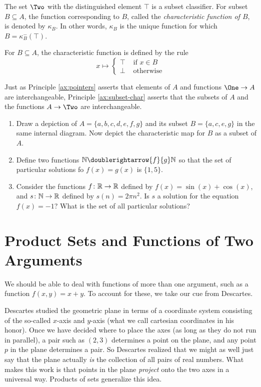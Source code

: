 \begin{principle}\label{ax:subset-char}
	The set $\Two$ with the distinguished element $\top$ is a subset classifier.
	For subset $B\subseteq A$, the function corresponding to $B$, called the \emph{characteristic function of $B$}, is denoted by $\kappa_B$.
	In other words, $\kappa_B$ is the unique function for which $B = \kappa_B^-(\top)$.

	For $B\subseteq A$, the characteristic function is defined by the rule
	\[
	x \mapsto
		\begin{cases}
			\top &\text{ if } x\in B\\
			\bot &\text{ otherwise}
		\end{cases}
	\]
\end{principle}

Just as Principle \ref{ax:pointers} asserts that elements of $A$ and functions $\One\to A$ are interchangeable, Principle \ref{ax:subset-char} asserts that the subsets of $A$ and the functions $A\to\Two$ are interchangeable.

\begin{exercises}
	\begin{enumerate}
	\item Draw a depiction of $A=\{a,b,c,d,e,f,g\}$ and its subset $B=\{a,c,e,g\}$ in the same internal diagram. Now depict the characteristic map for $B$ as a subset of $A$.
	
	\item Define two functions $\NN\doublerightarrow{f}{g}\NN$ so that the set of particular solutions fo $f(x)=g(x)$ is $\{1,5\}$. 
	
	\item Consider the functions ${f}\colon{\mathbb R}\to{\mathbb R}$ defined by $f(x) = \sin(x) + \cos(x)$, and ${s}\colon{\mathbb N}\to{\mathbb R}$ defined by $s(n) = 2\pi n^2$. 
	Is $s$ a solution for the equation $f(x) = -1$? 
	What is the set of all particular solutions?
	\end{enumerate}
		
\end{exercises}

\section{Product Sets and Functions of Two Arguments}

We should be able to deal with functions of more than one argument, such as a function $f(x,y) = x+y$.
To account for these, we take our cue from Descartes.

Descartes studied the geometric plane in terms of a coordinate system consisting of the so-called $x$-axis and $y$-axis (what we call cartesian coordinates in his honor).
Once we have decided where to place the axes (as long as they do not run in parallel), a pair such as $(2,3)$ determines a point on the plane, and any point $p$ in the plane determines a pair.
So Descartes realized that we might as well just say that the plane actually \emph{is} the collection of all pairs of real numbers.
What makes this work is that points in the plane \emph{project} onto the two axes in a universal way.
Products of sets generalize this idea.


